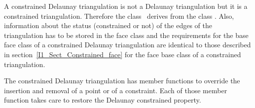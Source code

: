A constrained Delaunay triangulation is not a Delaunay
triangulation but it is a constrained triangulation.
Therefore the class \ccClassTemplateName\ derives from
the class .
Also, information about the status (constrained or not)
of the edges of the triangulation has to be stored
in the face class
 and the requirements for the base face class
of a constrained Delaunay triangulation are 
identical to those described in 
section~\ref{I1_Sect_Constrained_face} for the face base class
of a constrained  triangulation.

The constrained Delaunay triangulation
has member functions to override the 
insertion and removal of a point or of a constraint.
Each of those member function takes care
to  restore
 the Delaunay constrained
property.


